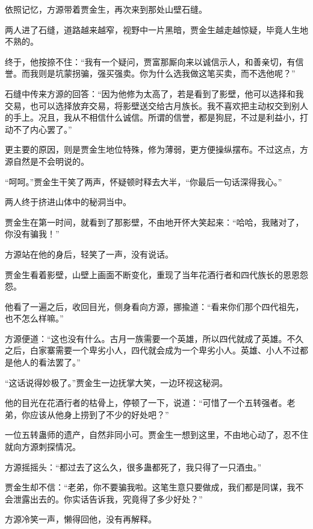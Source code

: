 
\begin{this_body}

依照记忆，方源带着贾金生，再次来到那处山壁石缝。

两人进了石缝，道路越来越窄，视野中一片黑暗，贾金生越走越惊疑，毕竟人生地不熟的。

终于，他按捺不住：“我有一个疑问，贾富那厮向来以诚信示人，和善亲切，有信誉。而我则是坑蒙拐骗，强买强卖。你为什么选我做这笔买卖，而不选他呢？”

石缝中传来方源的回答：“因为他修为太高了，若是看到了影壁，他可以选择和我交易，也可以选择放弃交易，将影壁送交给古月族长。我不喜欢把主动权交到别人的手上。况且，我从不相信什么诚信。所谓的信誉，都是狗屁，不过是利益小，打动不了内心罢了。”

更主要的原因，则是贾金生地位特殊，修为薄弱，更方便操纵摆布。不过这点，方源自然是不会明说的。

“呵呵。”贾金生干笑了两声，怀疑顿时释去大半，“你最后一句话深得我心。”

两人终于挤进山体中的秘洞当中。

贾金生在第一时间，就看到了那影壁，不由地开怀大笑起来：“哈哈，我赌对了，你没有骗我！”

方源站在他的身后，轻笑了一声，没有说话。

贾金生看着影壁，山壁上画面不断变化，重现了当年花酒行者和四代族长的恩恩怨怨。

他看了一遍之后，收回目光，侧身看向方源，挪揄道：“看来你们那个四代祖先，也不怎么样嘛。”

方源便道：“这也没有什么。古月一族需要一个英雄，所以四代就成了英雄。不久之后，白家寨需要一个卑劣小人，四代就会成为一个卑劣小人。英雄、小人不过都是他人的看法罢了。”

“这话说得妙极了。”贾金生一边抚掌大笑，一边环视这秘洞。

他的目光在花酒行者的枯骨上，停顿了一下，说道：“可惜了一个五转强者。老弟，你应该从他身上捞到了不少的好处吧？”

一位五转蛊师的遗产，自然非同小可。贾金生一想到这里，不由地心动了，忍不住就向方源刺探情况。

方源摇摇头：“都过去了这么久，很多蛊都死了，我只得了一只酒虫。”

贾金生却不信：“老弟，你不要骗我啦。这笔生意只要做成，我们都是同谋，我不会泄露出去的。你实话告诉我，究竟得了多少好处？”

方源冷笑一声，懒得回他，没有再解释。


\end{this_body}
